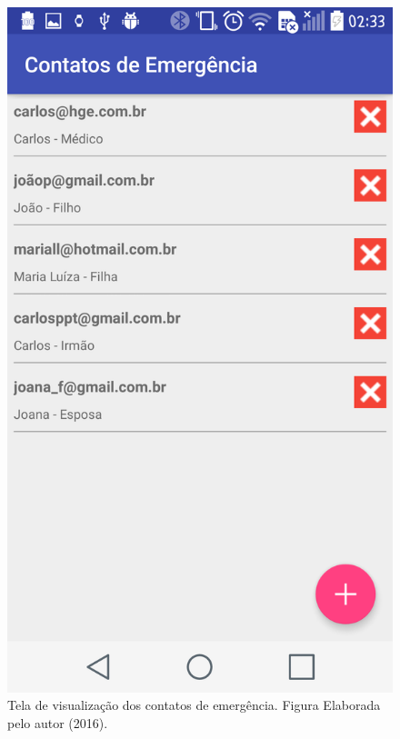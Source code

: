 \begin{figure}[ht]
	\centering
	\includegraphics[scale=0.3]{imagens/tela_contatos.png}
	\caption{Tela de visualização dos contatos de emergência. Figura Elaborada pelo autor (2016).}
	\label{fig:list_contacts}
\end{figure}



